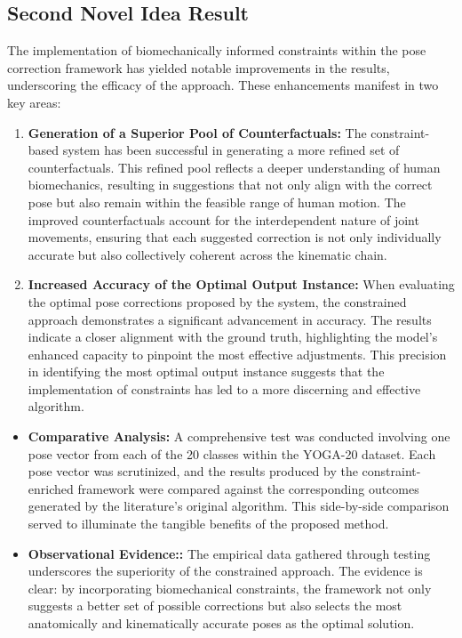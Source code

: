 \subsection{Second Novel Idea Result}
The implementation of biomechanically informed constraints within the pose correction framework has yielded notable improvements in the results, underscoring the efficacy of the approach. These enhancements manifest in two key areas:
\begin{enumerate}
    \item \textbf{Generation of a Superior Pool of Counterfactuals:} \newline
    The constraint-based system has been successful in generating a more refined set of counterfactuals. This refined pool reflects a deeper understanding of human biomechanics, resulting in suggestions that not only align with the correct pose but also remain within the feasible range of human motion. The improved counterfactuals account for the interdependent nature of joint movements, ensuring that each suggested correction is not only individually accurate but also collectively coherent across the kinematic chain.
    \item \textbf{Increased Accuracy of the Optimal Output Instance:} \newline
    When evaluating the optimal pose corrections proposed by the system, the constrained approach demonstrates a significant advancement in accuracy. The results indicate a closer alignment with the ground truth, highlighting the model's enhanced capacity to pinpoint the most effective adjustments. This precision in identifying the most optimal output instance suggests that the implementation of constraints has led to a more discerning and effective algorithm.
    
\end{enumerate}
\begin{itemize}
    \item \textbf{Comparative Analysis:} \newline 
    A comprehensive test was conducted involving one pose vector from each of the 20 classes within the YOGA-20 dataset. Each pose vector was scrutinized, and the results produced by the constraint-enriched framework were compared against the corresponding outcomes generated by the literature's original algorithm. This side-by-side comparison served to illuminate the tangible benefits of the proposed method.
    \item \textbf{Observational Evidence::} \newline 
    The empirical data gathered through testing underscores the superiority of the constrained approach. The evidence is clear: by incorporating biomechanical constraints, the framework not only suggests a better set of possible corrections but also selects the most anatomically and kinematically accurate poses as the optimal solution.


\end{itemize}
